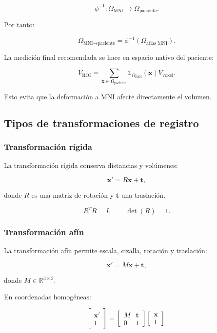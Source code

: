 \documentclass[12pt,a4paper]{article}
\begin{document}
\[
\phi^{-1}:\Omega_{\text{MNI}}\rightarrow\Omega_{\text{paciente}}.
\]

Por tanto:

\[
\Omega_{\text{MNI}\rightarrow\text{paciente}}
=
\phi^{-1}(\Omega_{\text{atlas MNI}}).
\]

La medición final recomendada se hace en espacio nativo del paciente:

\[
V_{\text{ROI}}
=
\sum_{\mathbf{x}\in\Omega_{\text{paciente}}}
\mathbb{1}_{\Omega_{\text{ROI}}}(\mathbf{x})
V_{\text{voxel}}.
\]

Esto evita que la deformación a MNI afecte directamente el volumen.

\subsection{Tipos de transformaciones de registro}

\subsubsection{Transformación rígida}

La transformación rígida conserva distancias y volúmenes:

\[
\mathbf{x}' = R\mathbf{x}+\mathbf{t},
\]

donde \(R\) es una matriz de rotación y \(\mathbf{t}\) una traslación.

\[
R^TR=I,\qquad \det(R)=1.
\]

\subsubsection{Transformación afín}

La transformación afín permite escala, cizalla, rotación y traslación:

\[
\mathbf{x}' = M\mathbf{x}+\mathbf{t},
\]

donde \(M\in\mathbb{R}^{3\times3}\).

En coordenadas homogéneas:

\[
\begin{bmatrix}
\mathbf{x}'\\1
\end{bmatrix}
=
\begin{bmatrix}
M & \mathbf{t}\\
0 & 1
\end{bmatrix}
\begin{bmatrix}
\mathbf{x}\\1
\end{bmatrix}.
\]
\end{document}
